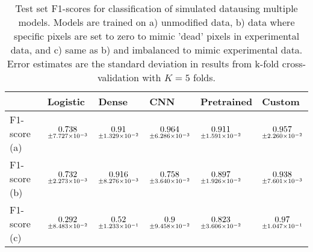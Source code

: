\begin{table}
\centering
\caption{
Test set F1-scores for classification of simulated datausing multiple models.
Models are trained on a) unmodified data, b) data where specific pixels are set to zero to mimic
'dead' pixels in experimental data, and c) same as b) and imbalanced to mimic experimental data. 
Error estimates are the standard deviation in results from k-fold cross-validation with $K=5$ folds.
}
\label{tab:classification-simulated-all-f1-auc}
\begin{tabular}{llllll}
\toprule
{} &                                            Logistic &                                               Dense &                                                 CNN &                                          Pretrained &                                              Custom \\
\midrule
F1-score (a) &  $\underset{\num{+- 7.727e-03 }  }{\num{ 0.738 } }$ &  $\underset{\num{+- 1.329e-02 }  }{\num{ 0.91 } }$ &  $\underset{\num{+- 6.286e-03 }  }{\num{ 0.964 } }$ &  $\underset{\num{+- 1.591e-02 }  }{\num{ 0.911 } }$ &  $\underset{\num{+- 2.260e-02 }  }{\num{ 0.957 } }$ \\
F1-score (b) &  $\underset{\num{+- 2.273e-03 }  }{\num{ 0.732 } }$ &  $\underset{\num{+- 8.276e-03 }  }{\num{ 0.916 } }$ &  $\underset{\num{+- 3.640e-02 }  }{\num{ 0.758 } }$ &  $\underset{\num{+- 1.926e-02 }  }{\num{ 0.897 } }$ &  $\underset{\num{+- 7.601e-03 }  }{\num{ 0.938 } }$ \\
F1-score (c) &  $\underset{\num{+- 8.483e-02 }  }{\num{ 0.292 } }$ &  $\underset{\num{+- 1.233e-01 }  }{\num{ 0.52 } }$ &  $\underset{\num{+- 9.458e-02 }  }{\num{ 0.9 } }$ &  $\underset{\num{+- 3.606e-02 }  }{\num{ 0.823 } }$ &  $\underset{\num{+- 1.047e-01 }  }{\num{ 0.97 } }$ \\
\bottomrule
\end{tabular}
\end{table}
